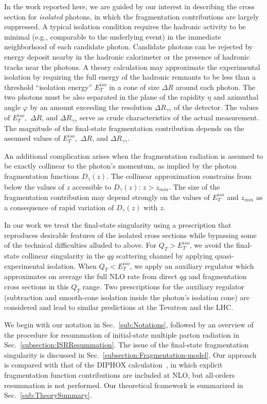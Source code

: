 \documentclass[12pt,english,aps,preprint,prd,letterpaper,fleqn,nofootinbib,showpacs,showkeys,tightenlines,floatfix]{revtex4}
\begin{document}
In the work reported here, we are guided by our interest in describing
the cross section for \emph{isolated} photons, in which the fragmentation
contributions are largely suppressed. A typical isolation condition
requires the hadronic activity to be minimal (e.g., comparable to
the underlying event) in the immediate neighborhood of each candidate
photon. Candidate photons can be rejected by energy deposit nearby 
in the hadronic calorimeter or the presence of hadronic
tracks near the photons. A theory calculation may approximate the
experimental isolation by requiring the full energy of the hadronic
remnants to be less than a threshold {}``isolation energy'' $E_{T}^{iso}$
in a cone of size $\Delta R$ around each photon. The two photons
must be also separated in the plane of the rapidity $\eta$ and azimuthal angle
$\varphi$ by an amount exceeding the resolution $\Delta R_{\gamma\gamma}$
of the detector. The values of $E_{T}^{iso},$ $\Delta R$, and $\Delta R_{\gamma\gamma}$
serve as crude characteristics of the actual measurement. The magnitude
of the final-state fragmentation contribution depends on the assumed 
values of $E_{T}^{iso},$ $\Delta R$, and $\Delta R_{\gamma\gamma}$.

An additional complication arises when the fragmentation radiation
is assumed to be exactly collinear to the photon's momentum, as implied
by the photon fragmentation functions $D_{\gamma}(z)$. 
The collinear approximation
constrains from below the values of $z$ accessible to $D_{\gamma}(z)$:
$z>z_{min}$. The size of the fragmentation contribution may depend
strongly on the values of $E_{T}^{iso}$ and $z_{min}$ as a consequence
of rapid variation of $D_{\gamma}(z)$ with $z$.

In our work we treat the final-state singularity using a prescription
that reproduces desirable features of the isolated cross sections
while bypassing some of the technical difficulties alluded to above.
For $Q_{T}>E_{T}^{iso}$, we avoid the final-state collinear singularity
in the $qg$ scattering channel by applying quasi-experimental isolation.
When $Q_{T}<E_{T}^{iso}$, we apply an auxiliary regulator which approximates
on average the full NLO rate from direct $qg$ and fragmentation cross
sections in this $Q_{T}$ range. Two prescriptions for the auxiliary
regulator (subtraction and smooth-cone isolation inside the photon's
isolation cone) are considered and lead to similar predictions at
the Tevatron and the LHC.

We begin with our notation in Sec.~\ref{sub:Notations}, followed by an overview
of the procedure for resummation of initial-state multiple parton
radiation in Sec.~\ref{subsection:ISRResummation}. The issue of
the final-state fragmentation singularity is discussed in
Sec.~\ref{subsection:Fragmentation-model}. Our approach is compared 
with that of the DIPHOX calculation~\cite{Binoth:1999qq},
in which explicit fragmentation function contributions are included
at NLO, but all-orders resummation is not performed.
Our theoretical framework is summarized in Sec.~\ref{sub:TheorySummary}.
\end{document}
